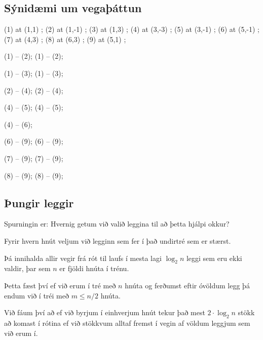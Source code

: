 \subsection{Sýnidæmi um vegaþáttun}
{
    \center
    {
         (1) at (1,1) {\phantom{xx}};
         (2) at (1,-1) {\phantom{xx}};
         (3) at (1,3) {\phantom{xx}};
         (4) at (3,-3) {\phantom{xx}};
         (5) at (3,-1) {\phantom{xx}};
         (6) at (5,-1) {\phantom{xx}};
         (7) at (4,3) {\phantom{xx}};
         (8) at (6,3) {\phantom{xx}};
         (9) at (5,1) {\phantom{xx}};

         {  (1) -- (2); }
         {  (1) -- (2); }

         {  (1) -- (3); }
         {  (1) -- (3); }

         {  (2) -- (4); }
         {  (2) -- (4); }

         {  (4) -- (5); }
         {  (4) -- (5); }

         {  (4) -- (6); }

         {  (6) -- (9); }
         {  (6) -- (9); }

         {  (7) -- (9); }
         {  (7) -- (9); }

         {  (8) -- (9); }
         {  (8) -- (9); }
    }
}

\subsection{Þungir leggir}
{
    {
        \item<1-> Spurningin er: Hvernig getum við valið leggina til að þetta hjálpi okkur?
        \item<2-> Fyrir hvern hnút veljum við legginn sem fer í það undirtré sem er stærst.
        \item<3-> Þá innihalda allir vegir frá rót til laufs í mesta lagi $\log_2 n$ leggi sem eru ekki valdir, þar sem $n$ er fjöldi hnúta í trénu.
        \item<4-> Þetta fæst því ef við erum í tré með $n$ hnúta og ferðumst eftir óvöldum legg þá endum við í tréi með $m \leq n/2$ hnúta.
        \item<5-> Við fáum því að ef við byrjum í einhverjum hnút tekur það mest $2 \cdot \log_2 n$ stökk að komast í rótina ef við stökkvum alltaf
                    fremst í vegin af völdum leggjum sem við erum í.
    }
}

